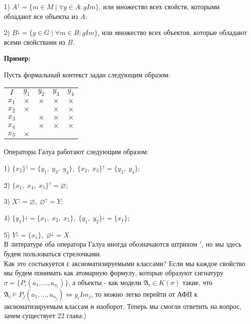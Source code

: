 \documentclass[18pt, a4paper]{extarticle}
\newcounter{par}
\newcommand{\primer}{\textbf{Пример:\;}}
\newcommand{\mA}{\mathfrak{A}}
\newcommand{\galoisup}{{^\uparrow}}
\newcommand{\galoisdown}{{^\downarrow}}
\newcommand{\vD}{\vDash}
\newcommand{\sg}{\sigma}
\begin{document}
1) $A\galoisup=\{m\in M\;|\;\forall g\in A:gIm\}$, или множество всех свойств, которыми обладают все объекты из $A$;

2) $B\galoisdown=\{g\in G\;|\;\forall m\in B:gIm\}$, или множество всех объектов, которые обладают всеми свойствами из $B$.

\primer

Пусть формальный контекст задан следующим образом:

\begin{center}
\begin{tabular}{|c|cccc|}
\cline{1-5}
\textbf{$I$} & \textbf{$y_1$} & \textbf{$y_2$} & \textbf{$y_3$} & \textbf{$y_4$} \\
\cline{1-5}
\textbf{$x_1$} & $\times$ & $\times$ & $\times$ & $\times$ \\
\textbf{$x_2$} & $\times$ & & $\times$ & $\times$ \\
\textbf{$x_3$} & & $\times$ & $\times$ & $\times$ \\
\textbf{$x_4$} & & $\times$ & $\times$ & $\times$ \\
\textbf{$x_5$} & $\times$ & & & \\
\cline{1-5}
\end{tabular}
\end{center}

Операторы Галуа работают следующим образом:

1) $\{x_2\}\galoisup=\{y_1,\;y_3,\;y_4\},\;\{x_2,\;x_3\}\galoisup=\{y_3,\;y_4\}$;

2) $\{x_1,\;x_4,\;x_5\}\galoisup=\varnothing$;

3) $X\galoisup=\varnothing,\;\varnothing\galoisup=Y$;

4) $\{y_1\}\galoisdown=\{x_1,\;x_2,\;x_5\},\;\{y_1,\;y_2\}\galoisdown=\{x_1\}$;

5) $Y\galoisdown=\{x_1\},\;\varnothing\galoisdown=X$.\\

В литературе оба оператора Галуа иногда обозначаются штрихом $'$, но мы здесь будем пользоваться стрелочками.\\

Как это состыкуется с аксиоматизируемыми классами? Если мы каждое свойство мы будем понимать как атомарную формулу, которые образуют сигнатуру $\sg=\{P_i(a_1, ..., a_{n_i})\}$, а объекты - как модели
$\mA_i\in K(\sg)$ такие, что $\mA_i\vD P_j(a_1, ..., a_{n_j})\Leftrightarrow g_iIm_j$, то можно легко перейти от АФП к аксиоматизируемым классам и наоборот. Теперь мы смогли ответить на вопрос, зачем существует 22 глава:)\\
\end{document}
